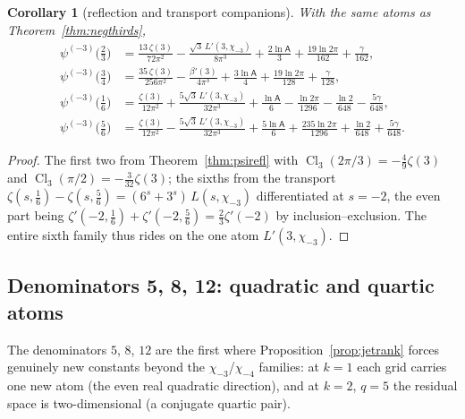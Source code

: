 \documentclass[11pt]{article}
\newtheorem{corollary}[theorem]{Corollary}
\theoremstyle{remark}
\newcommand{\Glaisher}{\mathsf{A}}
\begin{document}
\begin{corollary}[reflection and transport companions]
\label{cor:psi3companions}
With the same atoms as Theorem~\ref{thm:negthirds},
\begin{align*}
\psi^{(-3)}\bigl(\tfrac23\bigr)
&=\frac{13\,\zeta(3)}{72\pi^2}-\frac{\sqrt3\,L'(3,\chi_{-3})}{8\pi^3}
+\frac{2\ln\Glaisher}{3}+\frac{19\ln2\pi}{162}+\frac{\gamma}{162},\\
\psi^{(-3)}\bigl(\tfrac34\bigr)
&=\frac{35\,\zeta(3)}{256\pi^2}-\frac{\beta'(3)}{4\pi^3}
+\frac{3\ln\Glaisher}{4}+\frac{19\ln2\pi}{128}+\frac{\gamma}{128},\\
\psi^{(-3)}\bigl(\tfrac16\bigr)
&=\frac{\zeta(3)}{12\pi^2}+\frac{5\sqrt3\,L'(3,\chi_{-3})}{32\pi^3}
+\frac{\ln\Glaisher}{6}-\frac{\ln2\pi}{1296}-\frac{\ln2}{648}
-\frac{5\gamma}{648},\\
\psi^{(-3)}\bigl(\tfrac56\bigr)
&=\frac{\zeta(3)}{12\pi^2}-\frac{5\sqrt3\,L'(3,\chi_{-3})}{32\pi^3}
+\frac{5\ln\Glaisher}{6}+\frac{235\ln2\pi}{1296}+\frac{\ln2}{648}
+\frac{5\gamma}{648}.
\end{align*}
\end{corollary}

\begin{proof}
The first two from Theorem~\ref{thm:psirefl} with
$\operatorname{Cl}_3(2\pi/3)=-\tfrac49\zeta(3)$ and
$\operatorname{Cl}_3(\pi/2)=-\tfrac3{32}\zeta(3)$; the sixths from the
transport $\zeta(s,\tfrac16)-\zeta(s,\tfrac56)=(6^s+3^s)\,L(s,\chi_{-3})$
differentiated at $s=-2$, the even part being
$\zeta'(-2,\tfrac16)+\zeta'(-2,\tfrac56)=\tfrac23\zeta'(-2)$ by
inclusion--exclusion. The entire sixth family thus rides on the one atom
$L'(3,\chi_{-3})$.
\end{proof}

\subsection{Denominators 5, 8, 12: quadratic and quartic atoms}
\label{sec:negq5812}

The denominators $5$, $8$, $12$ are the first where
Proposition~\ref{prop:jetrank} forces genuinely new constants beyond the
$\chi_{-3}$/$\chi_{-4}$ families: at $k=1$ each grid carries one new atom
(the even real quadratic direction), and at $k=2$, $q=5$ the residual
space is two-dimensional (a conjugate quartic pair).
\end{document}
